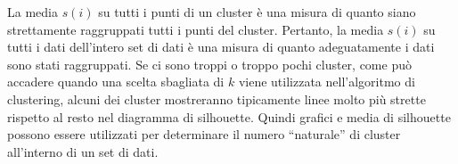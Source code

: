 La media $s(i)$ su tutti i punti di un cluster è una misura di quanto siano strettamente raggruppati tutti i punti del cluster. Pertanto, la media $s(i)$ su tutti i dati dell'intero set di dati è una misura di quanto adeguatamente i dati sono stati raggruppati. Se ci sono troppi o troppo pochi cluster, come può accadere quando una scelta sbagliata di $k$ viene utilizzata nell'algoritmo di clustering, alcuni dei cluster mostreranno tipicamente linee molto più strette rispetto al resto nel diagramma di silhouette. Quindi grafici e media di silhouette possono essere utilizzati per determinare il numero “naturale” di cluster all'interno di un set di dati.